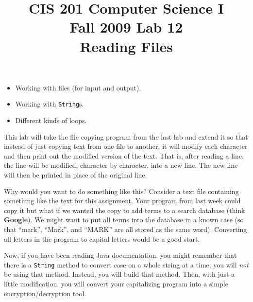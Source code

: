 \documentclass[12pt,oneside]{memoir}
\title{CIS 201 Computer Science I\\Fall 2009 Lab #1\\#2}%
\newcommand\code[1]{\lstinline^#1^}
\newcommand{\lab}[2]{%
  \title{CIS 201 Computer Science I\\Fall 2009 Lab #1\\#2}%
  \maketitle%
}
\begin{document}
\lab{12}{Reading Files}

\begin{itemize}
\item Working with files (for input and output).
\item Working with \code{String}s.
\item Different kinds of loops.
\end{itemize}

This lab will take the file copying program from the last lab and
extend it so that instead of just copying text from one file to
another, it will modify each character and then print out the modified
version of the text. That is, after reading a line, the line will be
modified, character by character, into a new line. The new line will
then be printed in place of the original line.

Why would you want to do something like this? Consider a text file
containing something like the text for this assignment. Your program
from last week could copy it but what if we wanted the copy to add
terms to a search database (think \textbf{Google}). We might want to
put all terms into the database in a known case (so that ``mark'',
``Mark'', and ``MARK'' are all stored as the same word). Converting
all letters in the program to capital letters would be a good start. 

Now, if you have been reading Java documentation, you might remember
that there is a \code{String} method to convert case on a whole string
at a time; you will \emph{not} be using that method. Instead, you will
build that method. Then, with just a little modification, you will
convert your capitalizing program into a simple encryption/decryption
tool.
\end{document}

